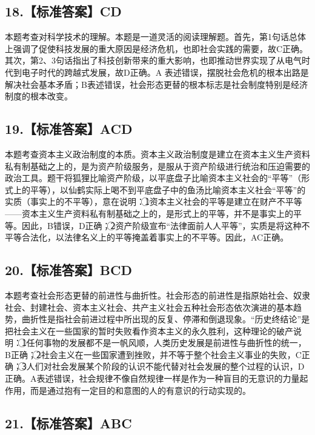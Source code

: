 \documentclass[UTF8,11pt]{ctexart}
\begin{document}
\subsection*{18.【标准答案】CD}

本题考查对科学技术的理解。本题是一道灵活的阅读理解题。首先，第1句话总体上强调了促使科技发展的重大原因是经济危机，也即社会实践的需要，故C正确。其次，第2、3句话指出了科技创新带来的重大影响，也即推动世界实现了从电气时代到电子时代的跨越式发展，故D正确。A 表述错误，摆脱社会危机的根本出路是解决社会基本矛盾；B表述错误，社会形态更替的根本标志是社会制度特别是经济制度的根本改变。


\subsection*{19.【标准答案】ACD}

本题考查资本主义政治制度的本质。资本主义政治制度是建立在资本主义生产资料私有制基础之上的，是为资产阶级服务，是服从于资产阶级进行统治和压迫需要的政治工具。题干将狐狸比喻资产阶级，以平底盘子比喻资本主义社会的“平等”（形式上的平等），以仙鹤实际上喝不到平底盘子中的鱼汤比喻资本主义社会“平等”的实质（事实上的不平等），意在说明：\textcircled{1}资本主义社会的平等是建立在财产不平等——资本主义生产资料私有制基础之上的，是形式上的平等，并不是事实上的平等。因此，B错误，D正确；\textcircled{2}资产阶级宣布“法律面前人人平等”，实质是将这种不平等合法化，以法律名义上的平等掩盖着事实上的不平等。因此，AC正确。


\subsection*{20.【标准答案】BCD}

本题考查社会形态更替的前进性与曲折性。社会形态的前进性是指原始社会、奴隶社会、封建社会、资本主义社会、共产主义社会五种社会形态依次演进的基本趋势，曲折性是指社会前进过程中所出现的反复、停滞和倒退现象。“历史终结论”是把社会主义在一些国家的暂时失败看作资本主义的永久胜利，这种理论的破产说明：\textcircled{1}任何事物的发展都不是一帆风顺，人类历史发展是前进性与曲折性的统一，B正确；\textcircled{2}社会主义在一些国家遭到挫败，并不等于整个社会主义事业的失败，C正确；\textcircled{3}人们对社会发展某个阶段的认识不能代替对社会发展的整个过程的认识，D正确。A表述错误，社会规律不像自然规律一样是作为一种盲目的无意识的力量起作用，而是通过抱有一定目的和意图的人的有意识的行动实现的。


\subsection*{21.【标准答案】ABC}
\end{document}
